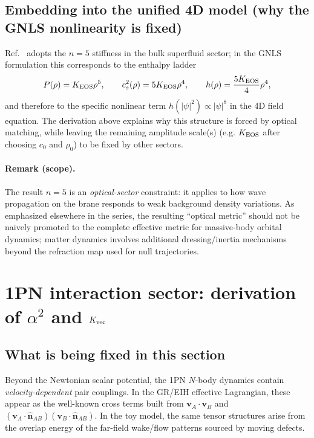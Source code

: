\documentclass[11pt]{article}
\begin{document}
\subsection{Embedding into the unified 4D model (why the GNLS nonlinearity is fixed)}

Ref.~\cite{norris2026_4d_model} adopts the $n=5$ stiffness in the bulk superfluid sector; in the GNLS formulation this corresponds to the enthalpy ladder
\begin{equation}
P(\rho)=K_{\rm EOS}\rho^5,\qquad
c_s^2(\rho)=5K_{\rm EOS}\rho^4,\qquad
h(\rho)=\frac{5K_{\rm EOS}}{4}\rho^4,
\label{eq:n5_ladder}
\end{equation}
and therefore to the specific nonlinear term $h(|\psi|^2)\propto |\psi|^8$ in the 4D field equation. The derivation above explains why this structure is forced by optical matching, while leaving the remaining amplitude scale(s) (e.g. $K_{\rm EOS}$ after choosing $c_0$ and $\rho_0$) to be fixed by other sectors. 

\paragraph{Remark (scope).}
The result $n=5$ is an \emph{optical-sector} constraint: it applies to how wave propagation on the brane responds to weak background density variations. As emphasized elsewhere in the series, the resulting ``optical metric'' should not be naively promoted to the complete effective metric for massive-body orbital dynamics; matter dynamics involves additional dressing/inertia mechanisms beyond the refraction map used for null trajectories. 

\section{1PN interaction sector: derivation of \texorpdfstring{$\alpha^2$}{alpha squared} and \texorpdfstring{$K_{\rm vec}$}{K vec}}
\label{sec:1pn-interaction-alpha-K}

\subsection{What is being fixed in this section}
\label{sec:1pn-interaction-goal}

Beyond the Newtonian scalar potential, the 1PN $N$-body dynamics contain
\emph{velocity-dependent} pair couplings.  In the GR/EIH effective Lagrangian,
these appear as the well-known cross terms built from
$\mathbf v_A\cdot \mathbf v_B$ and $(\mathbf v_A\cdot \hat{\mathbf n}_{AB})(\mathbf v_B\cdot \hat{\mathbf n}_{AB})$.
In the toy model, the same tensor structures arise from the overlap energy of
the far-field wake/flow patterns sourced by moving defects.
\end{document}
